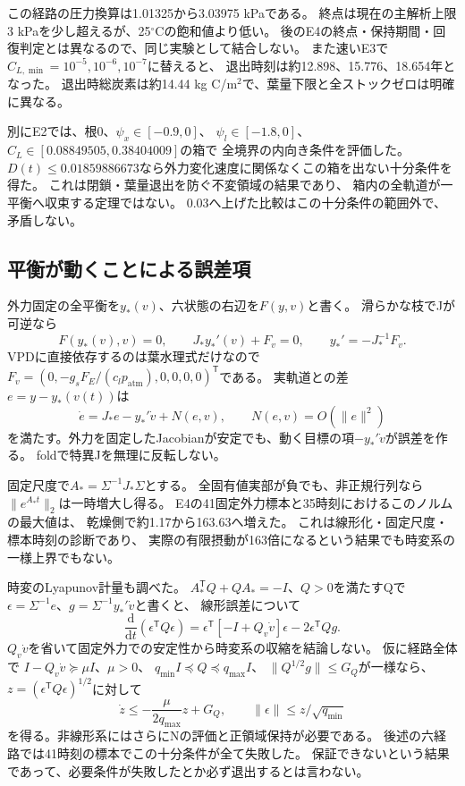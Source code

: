 \documentclass[a4paper,11pt]{ltjsarticle}
\newcommand{\dd}{\mathrm{d}}
\newcommand{\tr}{^{\mathsf T}}
\begin{document}
この経路の圧力換算は1.01325から3.03975 kPaである。
終点は現在の主解析上限3 kPaを少し超えるが、25$^\circ$Cの飽和値より低い。
後のE4の終点・保持期間・回復判定とは異なるので、同じ実験として結合しない。
また速いE3で$C_{L,\min}=10^{-5},10^{-6},10^{-7}$に替えると、
退出時刻は約12.898、15.776、18.654年となった。
退出時総炭素は約14.44 kg C/m$^2$で、葉量下限と全ストックゼロは明確に異なる。

別にE2では、根0、$\psi_x\in[-0.9,0]$、
$\psi_l\in[-1.8,0]$、$C_L\in[0.08849505,0.38404009]$の箱で
全境界の内向き条件を評価した。
$D(t)\le0.01859886673$なら外力変化速度に関係なくこの箱を出ない十分条件を得た。
これは閉鎖・葉量退出を防ぐ不変領域の結果であり、
箱内の全軌道が一平衡へ収束する定理ではない。
0.03へ上げた比較はこの十分条件の範囲外で、矛盾しない。

\subsection{平衡が動くことによる誤差項}
外力固定の全平衡を$y_*(v)$、六状態の右辺を$F(y,v)$と書く。
滑らかな枝でJが可逆なら
\begin{equation}
 F(y_*(v),v)=0,\qquad
 J_*y_*'(v)+F_v=0,\qquad y_*'=-J_*^{-1}F_v .
\end{equation}
VPDに直接依存するのは葉水理式だけなので
$F_v=(0,-g_sF_E/(c_lp_{\mathrm{atm}}),0,0,0,0)\tr$である。
実軌道との差$e=y-y_*(v(t))$は
\begin{equation}\label{eq:tracking}
 \dot e=J_*e-y_*'\dot v+N(e,v),\qquad N(e,v)=O(\|e\|^2)
\end{equation}
を満たす。外力を固定したJacobianが安定でも、動く目標の項$-y_*'\dot v$が誤差を作る。
foldで特異Jを無理に反転しない。

固定尺度で$A_*=\Sigma^{-1}J_*\Sigma$とする。
全固有値実部が負でも、非正規行列なら$\|e^{A_*t}\|_2$は一時増大し得る。
E4の41固定外力標本と35時刻におけるこのノルムの最大値は、
乾燥側で約1.17から163.63へ増えた。
これは線形化・固定尺度・標本時刻の診断であり、
実際の有限摂動が163倍になるという結果でも時変系の一様上界でもない。

時変のLyapunov計量も調べた。
$A_*\tr Q+QA_*=-I$、$Q>0$を満たすQで
$\epsilon=\Sigma^{-1}e$、$g=\Sigma^{-1}y_*'\dot v$と書くと、
線形誤差について
\begin{equation}
 \frac{\dd}{\dd t}(\epsilon\tr Q\epsilon)
 =\epsilon\tr[-I+Q_v\dot v]\epsilon-2\epsilon\tr Qg .
\end{equation}
$Q_v\dot v$を省いて固定外力での安定性から時変系の収縮を結論しない。
仮に経路全体で
$I-Q_v\dot v\succeq\mu I$、$\mu>0$、
$q_{\min}I\preceq Q\preceq q_{\max}I$、
$\|Q^{1/2}g\|\le G_Q$が一様なら、
$z=(\epsilon\tr Q\epsilon)^{1/2}$に対して
\begin{equation}
 \dot z\le-\frac{\mu}{2q_{\max}}z+G_Q,\qquad
 \|\epsilon\|\le z/\sqrt{q_{\min}}
\end{equation}
を得る。非線形系にはさらにNの評価と正領域保持が必要である。
後述の六経路では41時刻の標本でこの十分条件が全て失敗した。
保証できないという結果であって、必要条件が失敗したとか必ず退出するとは言わない。
\end{document}

